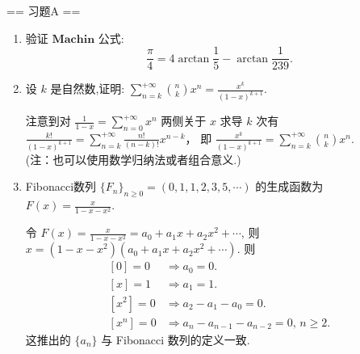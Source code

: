 \newenvironment{solution}{\begin{proofc}[解答]}{\end{proofc}}

== 习题A ==
\begin{enumerate}
    \item[1.]验证 $\textbf{Machin 公式}$:
    \[\displaystyle\frac{\pi}{4} = 4\arctan {\frac{1}{5}} - \arctan {\frac{1}{239}}.\]
    
    \item[2.]设 \(k\) 是自然数,证明: 
    \(\displaystyle \sum_{n = k}^{+\infty}\binom{n}{k} x^{n} = \frac{x^{k}}{(1 - x)^{k + 1}}.\)
    \begin{solution}
        注意到对 $\displaystyle \frac{1}{1-x}=\sum_{n=0}^{+\infty}x^n$ 
        两侧关于 $x$ 求导 $k$ 次有 $\displaystyle \frac{k!}{(1-x)^{k+1}}=\sum_{n=k}^{+\infty}\frac{n!}{(n-k)!}x^{n-k}$，
        即 $\displaystyle \frac{x^k}{(1-x)^{k+1}}=\sum_{n = k}^{+\infty}\binom{n}{k} x^{n}$.\\
        (注：也可以使用数学归纳法或者组合意义.)
    \end{solution}
    
    \item[3.]Fibonacci数列 \(\{F_{n}\}_{n\geq 0} = (0,1,1,2,3,5,\cdots)\) 的生成函数为 
    \(\displaystyle F(x) = \frac{x}{1 - x - x^{2}}.\)
    \begin{solution}
        令 $\displaystyle F(x)=\frac{x}{1-x-x^2} = a_0+a_1x+a_2x^2+\cdots$, 则 $x = (1-x-x^2)(a_0+a_1x+a_2x^2+\cdots)$. 则 
        \[
            \begin{aligned}
                [0]=0&\Rightarrow a_0=0.\\
                [x]=1&\Rightarrow a_1=1.\\
                [x^2]=0&\Rightarrow a_2-a_1-a_0=0.\\
                [x^n]=0&\Rightarrow a_n-a_{n-1}-a_{n-2}=0,\,n\geq 2.
            \end{aligned}
        \]
        这推出的 $\{a_n\}$ 与 Fibonacci 数列的定义一致.
    \end{solution}


\end{enumerate}
